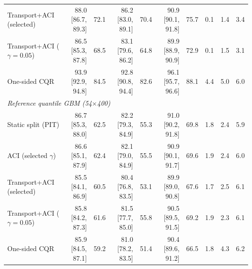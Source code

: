 \begin{table}[tp]
\begin{tabular}{l rrrrrr rrr}
\quad Transport+ACI (selected) & 88.0 [86.7, 89.3] & 72.1 & 86.2 [83.0, 89.1] & 70.4 & 90.9 [90.1, 91.8] & 75.7 & 0.1 & 1.4 & 3.4 \\
\quad Transport+ACI ($\gamma=0.05$) & 86.5 [85.3, 87.8] & 68.5 & 83.1 [79.6, 86.2] & 64.8 & 89.9 [88.9, 90.9] & 72.9 & 0.1 & 1.5 & 3.1 \\
\quad One-sided CQR & 93.9 [92.9, 94.8] & 84.5 & 92.8 [90.8, 94.4] & 82.6 & 96.1 [95.7, 96.6] & 88.1 & 4.4 & 5.0 & 6.0 \\
\multicolumn{10}{l}{\textit{Reference quantile GBM (54$\times$400)}} \\
\quad Static split (PIT) & 86.7 [85.3, 88.0] & 62.5 & 82.2 [79.3, 84.9] & 55.3 & 91.0 [90.2, 91.8] & 69.8 & 1.8 & 2.4 & 5.9 \\
\quad ACI (selected $\gamma$) & 86.6 [85.1, 87.9] & 62.4 & 82.1 [79.0, 84.9] & 55.5 & 90.9 [90.1, 91.7] & 69.6 & 1.9 & 2.4 & 6.0 \\
\quad Transport+ACI (selected) & 85.5 [84.1, 86.9] & 60.5 & 80.4 [76.8, 83.5] & 53.1 & 89.9 [89.0, 90.8] & 67.6 & 1.7 & 2.5 & 6.1 \\
\quad Transport+ACI ($\gamma=0.05$) & 85.8 [84.2, 87.3] & 61.6 & 81.5 [77.7, 85.0] & 55.8 & 90.5 [89.5, 91.5] & 69.2 & 1.9 & 2.3 & 6.1 \\
\quad One-sided CQR & 85.9 [84.5, 87.1] & 59.2 & 81.0 [78.2, 83.5] & 51.4 & 90.4 [89.6, 91.2] & 66.5 & 1.8 & 4.3 & 6.2 \\
\bottomrule
\end{tabular}
\end{table}
